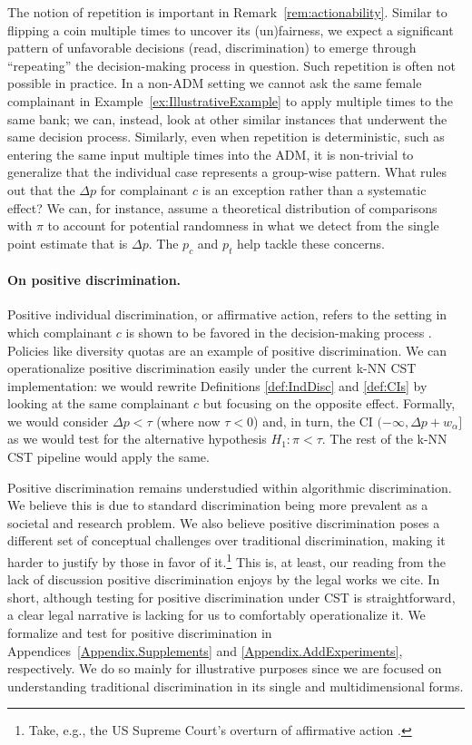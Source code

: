 The notion of repetition is important in Remark~\ref{rem:actionability}.
%
Similar to flipping a coin multiple times to uncover its (un)fairness, we expect a significant pattern of unfavorable decisions (read, discrimination) to emerge through ``repeating'' the decision-making process in question.
Such repetition is often not possible in practice. 
In a non-ADM setting we cannot ask the same female complainant in Example~\ref{ex:IllustrativeExample} to apply multiple times to the same bank;
we can, instead, look at other similar instances that underwent the same decision process.
Similarly, even when repetition is deterministic, such as entering the same input multiple times into the ADM, it is non-trivial to generalize that the individual case represents a group-wise pattern.
What rules out that the $\Delta p$ for complainant $c$ is an exception rather than a systematic effect?
We can, for instance, assume a theoretical distribution of comparisons with $\pi$ to account for potential randomness in what we detect from the single point estimate that is $\Delta p$.
The $p_c$ and $p_t$ help tackle these concerns.

\paragraph{On positive discrimination.}
Positive individual discrimination, or affirmative action, refers to the setting in which complainant $c$ is shown to be favored in the decision-making process \parencite{Romei2014MultiSurveyDiscrimination}.
Policies like diversity quotas are an example of positive discrimination.
We can operationalize positive discrimination easily under the current k-NN CST implementation: we would rewrite Definitions \ref{def:IndDisc} and \ref{def:CIs} by looking at the same complainant $c$ but focusing on the opposite effect.
Formally, we would consider $\Delta p < \tau$ (where now $\tau < 0$) and, in turn, the CI $(- \infty, \Delta p + w_\alpha]$ as we would test for the alternative hypothesis $H_1: \pi < \tau$. The rest of the k-NN CST pipeline would apply the same.

Positive discrimination remains understudied within algorithmic discrimination. 
We believe this is due to standard discrimination being more prevalent as a societal and research problem.
We also believe positive discrimination poses a different set of conceptual challenges over traditional discrimination, making it harder to justify by those in favor of it.\footnote{Take, e.g., the US Supreme Court's overturn of affirmative action \parencite{NPR2023AffirmativeAction}.}
This is, at least, our reading from the lack of discussion positive discrimination enjoys by the legal works we cite.
In short, although testing for positive discrimination under CST is straightforward, a clear legal narrative is lacking for us to comfortably operationalize it.
We formalize and test for positive discrimination in Appendices~\ref{Appendix.Supplements} and \ref{Appendix.AddExperiments}, respectively.
We do so mainly for illustrative purposes since we are focused on understanding traditional discrimination in its single and multidimensional forms.

